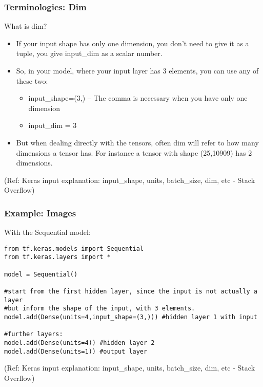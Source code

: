 \begin{frame}[fragile] \frametitle{Terminologies: Dim}

What is dim?

\begin{itemize}
\item If your input shape has only one dimension, you don't need to give it as a tuple, you give input\_dim as a scalar number.
\item So, in your model, where your input layer has 3 elements, you can use any of these two:
\begin{itemize}
\item input\_shape=(3,) -- The comma is necessary when you have only one dimension
\item input\_dim = 3
\end{itemize}
\item But when dealing directly with the tensors, often dim will refer to how many dimensions a tensor has. For instance a tensor with shape (25,10909) has 2 dimensions.
\end{itemize}

\tiny{(Ref: Keras input explanation: input\_shape, units, batch\_size, dim, etc - Stack Overflow)}
\end{frame}

\begin{frame}[fragile] \frametitle{Example: Images}

With the Sequential model:

\begin{lstlisting}
from tf.keras.models import Sequential  
from tf.keras.layers import *  

model = Sequential()    

#start from the first hidden layer, since the input is not actually a layer   
#but inform the shape of the input, with 3 elements.    
model.add(Dense(units=4,input_shape=(3,))) #hidden layer 1 with input

#further layers:    
model.add(Dense(units=4)) #hidden layer 2
model.add(Dense(units=1)) #output layer   
\end{lstlisting}

\tiny{(Ref: Keras input explanation: input\_shape, units, batch\_size, dim, etc - Stack Overflow)}
\end{frame}

